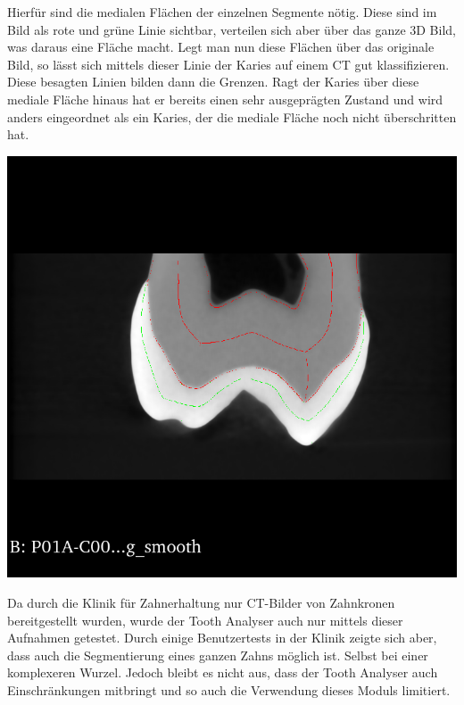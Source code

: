 \begin{minipage}{0.45\textwidth}
	Hierfür sind die medialen Flächen der einzelnen Segmente nötig. Diese sind im
	Bild als rote und grüne Linie sichtbar, verteilen sich aber über das ganze 3D Bild,
	was daraus eine Fläche macht. Legt man nun diese Flächen über das originale Bild,
	so lässt sich mittels dieser Linie der Karies auf einem \ac{CT} gut klassifizieren.
	Diese besagten Linien bilden dann die Grenzen. Ragt der Karies über diese mediale
	Fläche hinaus hat er bereits einen sehr ausgeprägten Zustand und wird anders eingeordnet
	als ein Karies, der die mediale Fläche noch nicht überschritten hat.
\end{minipage}
\hfill
\begin{minipage}{0.45\textwidth}
	\centering
	\includegraphics[scale=0.2, width=\textwidth]{img/classification.png}
	 \label{fig:classification}
\end{minipage}

Da durch die Klinik für Zahnerhaltung nur \ac{CT}-Bilder von Zahnkronen bereitgestellt
wurden, wurde der Tooth Analyser auch nur mittels dieser Aufnahmen getestet. Durch
einige Benutzertests in der Klinik zeigte sich aber, dass auch die Segmentierung
eines ganzen Zahns möglich ist. Selbst bei einer komplexeren Wurzel. Jedoch
bleibt es nicht aus, dass der Tooth Analyser auch Einschränkungen mitbringt und so
auch die Verwendung dieses Moduls limitiert.

